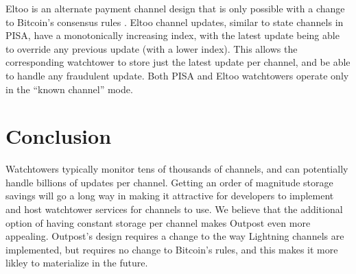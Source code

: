 Eltoo \cite{eltoo} is an alternate payment channel design that is only possible with a change to Bitcoin's consensus rules \cite{bip118}. Eltoo channel updates, similar to state channels in PISA, have a monotonically increasing index, with the latest update being able to override any previous update (with a lower index). This allows the corresponding watchtower to store just the latest update per channel, and be able to handle any fraudulent update. Both PISA and Eltoo watchtowers operate only in the ``known channel'' mode.

\section{Conclusion}
Watchtowers typically monitor tens of thousands of channels, and can potentially handle billions of updates per channel. Getting an order of magnitude storage savings will go a long way in making it attractive for developers to implement and host watchtower services for channels to use. We believe that the additional option of having constant storage per channel makes Outpost even more appealing. Outpost's design requires a change to the way Lightning channels are implemented, but requires no change to Bitcoin's rules, and this makes it more likley to materialize in the future.